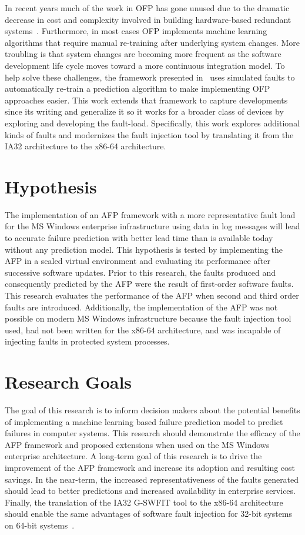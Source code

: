 In recent years much of the work in \ac{OFP} has gone unused due to the
dramatic decrease in cost and complexity involved in building hardware-based
redundant systems~\cite{irrera2015}.  Furthermore, in most cases \ac{OFP}
implements machine learning algorithms that require manual re-training after
underlying system changes.  More troubling is that system changes are becoming
more frequent as the software development life cycle moves toward a more
continuous integration model.  To help solve these challenges, the framework
presented in~\cite{irrera2015} uses simulated faults to automatically re-train
a prediction algorithm to make implementing \ac{OFP} approaches easier.  This
work extends that framework to capture developments since its writing and
generalize it so it works for a broader class of devices by exploring and
developing the fault-load.  Specifically, this work explores additional kinds
of faults and modernizes the fault injection tool by translating it from the
IA32 architecture to the x86-64 architecture.

\section{Hypothesis}
The implementation of an \ac{AFP} framework with a more representative fault
load for the \ac{MS} Windows enterprise infrastructure using data in log
messages will lead to accurate failure prediction with better lead time than is
available today without any prediction model.  This hypothesis is tested by
implementing the \ac{AFP} in a scaled virtual environment and evaluating its
performance after successive software updates.  Prior to this research, the
faults produced and consequently predicted by the \ac{AFP} were the result of
first-order software faults.  This research evaluates the performance of the
\ac{AFP} when second and third order faults are introduced.  Additionally, the
implementation of the \ac{AFP} was not possible on modern \ac{MS} Windows
infrastructure because the fault injection tool used, had not been written for
the x86-64 architecture, and was incapable of injecting faults in protected
system processes.

\section{Research Goals} 
The goal of this research is to inform decision makers about the potential
benefits of implementing a machine learning based failure prediction model to
predict failures in computer systems.  This research should demonstrate the
efficacy of the \ac{AFP} framework and proposed extensions when used on the
\ac{MS} Windows enterprise architecture.  A long-term goal of this research
is to drive the improvement of the \ac{AFP} framework and increase its adoption
and resulting cost savings.  In the near-term, the increased representativeness
of the faults generated should lead to better predictions and increased
availability in enterprise services.  Finally, the translation of the IA32
\ac{G-SWFIT} tool to the x86-64 architecture should enable the same advantages
of software fault injection for 32-bit systems on 64-bit systems~\cite{gswfit}.

